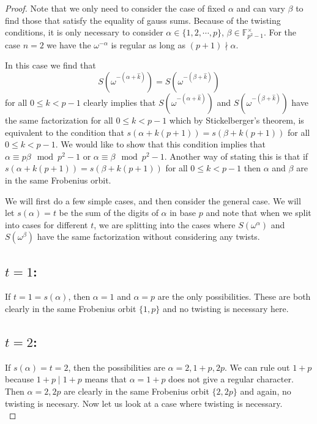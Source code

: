 \documentclass[12pt]{article}
\theoremstyle{customtheorem}%
\theoremstyle{remark}
\theoremstyle{definition}
\numberwithin{equation}{section}
\numberwithin{theorem}{section}
\newcommand{\F}{\mathbb{F}}
\begin{document}
\begin{proof}
Note that we only need to consider the case of fixed $\alpha$ and can vary $\beta$ to find those that satisfy the equality of gauss sums. 
Because of the twisting conditions, it is only necessary to consider $\alpha \in \{1, 2, \cdots , p\}$, $\beta \in \F_{p^2-1}^\times$. 
For the case $n=2$ we have the $\omega^{-\alpha}$ is regular as long as $(p+1)\nmid \alpha$.

In this case we find that \[S(\omega^{-(\alpha + \hat{k})}) = S(\omega^{-(\beta + \hat{k})})\] for all $0 \leq k < p-1$ clearly implies that $S(\omega^{-(\alpha+\hat{k})})$ and $S(\omega^{-(\beta + \hat{k})})$ have the same factorization for all $0 \leq k < p-1$ which by Stickelberger's theorem, is equivalent to the condition that $s(\alpha + k(p+1)) = s(\beta + k(p+1))$ for all $0 \leq k < p-1$. 
We would like to show that this condition implies that $\alpha \equiv p \beta \mod p^2 -1$ or $\alpha \equiv \beta \mod p^2 - 1$. 
Another way of stating this is that if $s(\alpha + k(p+1)) = s(\beta+k(p+1))$ for all $0 \leq k < p-1$ then $\alpha$ and $\beta$ are in the same Frobenius orbit.

We will first do a few simple cases, and then consider the general case.
We will let $s(\alpha) = t$ be the sum of the digits of $\alpha$ in base $p$ and note that when we split into cases for different $t$, we are splitting into the cases where $S(\omega^\alpha)$ and  $S(\omega^\beta)$ have the same factorization without considering any twists.
\\

\subsection{$t = 1$:} If $t = 1 = s(\alpha)$, then $\alpha = 1$ and $\alpha = p$ are the only possibilities. 
These are both clearly in the same Frobenius orbit $\{1,p\}$ and no twisting is necessary here.
\\

\subsection{$t = 2$:} If $s(\alpha) = t = 2$, then the possibilities are $\alpha = 2, 1+p, 2p$. 
We can rule out $1+p$ because $1+p \mid 1+p$ means that $\alpha = 1+p$ does not give a regular character. 
Then $\alpha = 2, 2p$ are clearly in the same Frobenius orbit $\{2,2p\}$ and again, no twisting is necesary. 
Now let us look at a case where twisting is necessary.
\\


\end{proof}
\end{document}
